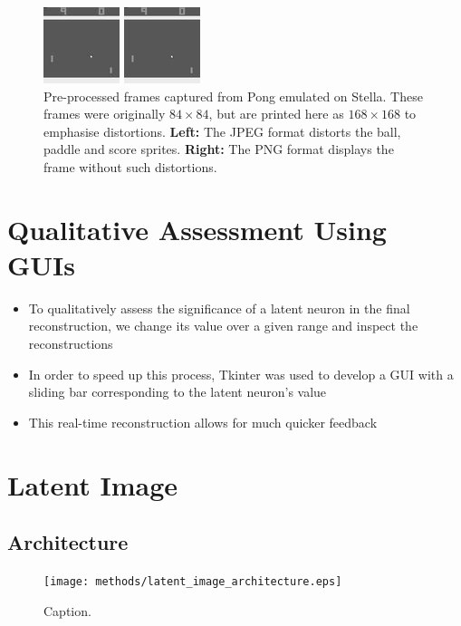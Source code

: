 \begin{figure}[h!]
\centering
\captionsetup{justification=centering}
\begin{multicols}{1}
    \includegraphics[scale=2.0]{figures/related_work/pong_729_pre_processed.jpeg}\par
    \includegraphics[scale=2.0]{figures/related_work/pong_729_pre_processed.png}\par
\end{multicols}
\caption{Pre-processed frames captured from Pong emulated on Stella. These frames were originally $84\times 84$, but are printed here as $168\times 168$ to emphasise distortions. \textbf{Left:} The JPEG format distorts the ball, paddle and score sprites. \textbf{Right:} The PNG format displays the frame without such distortions.}
\label{fig:pong_729_pre_processed}
\end{figure}


%
%
%
%
%
\section{Qualitative Assessment Using GUIs}
\begin{itemize}
\item To qualitatively assess the significance of a latent neuron in the final reconstruction, we change its value over a given range and inspect the reconstructions
\item In order to speed up this process, Tkinter was used to develop a GUI with a sliding bar corresponding to the latent neuron's value
\item This real-time reconstruction allows for much quicker feedback
\end{itemize}


%
%
%
%
%
\section{Latent Image}
\lipsum[2]
\subsection{Architecture}
\begin{figure}[H]
\centering
\captionsetup{justification=centering}
\texttt{[image: methods/latent\_image\_architecture.eps]}
\caption{Caption.}
\label{fig:latent_image_architecture}
\end{figure}

